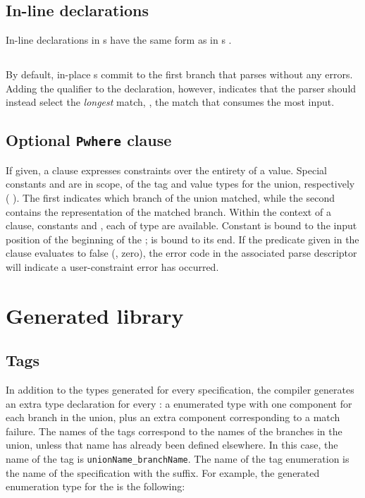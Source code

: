 \subsection{In-line declarations}
\label{sec:unions-inline}
In-line declarations in \Punion{}s have the same form as in
\Pstruct{}s \cf{} .

\subsection{\Plongest{}}
By default, in-place \Punion{}s commit to the first branch that parses
without any errors. Adding the \Plongest{} qualifier to the
\Punion{} declaration, however, indicates that the parser should
instead select the \textit{longest} match, \ie{}, the match that
consumes the most input. 

\subsection{Optional \texttt{Pwhere} clause}
If given, a \Pwhere{} clause expresses constraints over the entirety
of a \Punion{} value.  Special constants  and  are
in scope, of the tag and value types for the union, respectively
(\cf{} ).  The
first indicates which branch of the union matched, while the second
contains the representation of the matched branch. 
Within the context of a 
\Pparsecheck{} clause, constants  and , each of type 
\Ppost{} are available.  Constant  is bound to the input
position of the beginning of the \punion{};  is bound to its end.
If the predicate given in
the \Pwhere{} clause evaluates to false (\ie{}, zero), the error code
in the associated parse descriptor will indicate a user-constraint
error has occurred.  

\section{Generated library}
\subsection{Tags}
\label{sec:unions-tags}
In addition to the types generated for every \pads{} specification,
the \pads{} compiler generates an extra type 
declaration for every \Punion{}: a enumerated type with one component
for each branch in the union, plus an extra component corresponding to
a match failure.  The names of the tags correspond to the names of the
branches in the union, unless that name
has already been defined 
elsewhere.  In this case, the name of the tag is 
\texttt{unionName\_branchName}.  
The name of the tag enumeration is the name of
the \pads{} specification with the  suffix.
For example, the generated enumeration type
for the \Punion{}  is the following:

